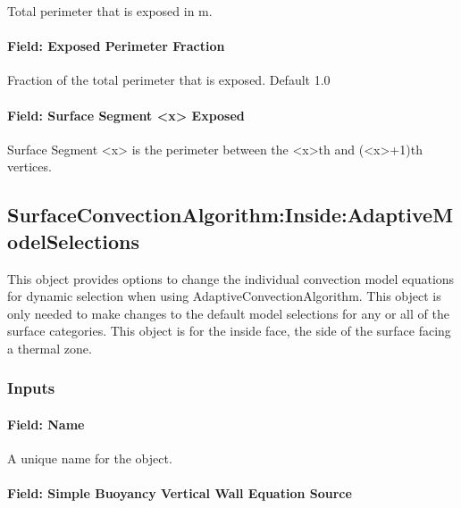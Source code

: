 Total perimeter that is exposed in m.

\paragraph{Field: Exposed Perimeter Fraction}\label{surfaceproperty-exposedfoundationperimeter-exposed-perimeter-fraction}

Fraction of the total perimeter that is exposed. Default 1.0

\paragraph{Field: Surface Segment \textless{}x\textgreater{} Exposed}\label{surfaceproperty-exposedfoundationperimeter-surface-segment-x-exposed}

Surface Segment \textless{}x\textgreater{} is the perimeter between the
\textless{}x\textgreater{}th and (\textless{}x\textgreater{}+1)th
vertices.

\subsection{SurfaceConvectionAlgorithm:Inside:AdaptiveModelSelections}\label{surfaceconvectionalgorithminsideadaptivemodelselections}

This object provides options to change the individual convection model equations for dynamic selection when using AdaptiveConvectionAlgorithm. This object is only needed to make changes to the default model selections for any or all of the surface categories. This object is for the inside face, the side of the surface facing a thermal zone.

\subsubsection{Inputs}\label{inputs-6}

\paragraph{Field: Name}\label{field-name-5}

A unique name for the object.

\paragraph{Field: Simple Buoyancy Vertical Wall Equation Source}\label{field-simple-buoyancy-vertical-wall-equation-source}

